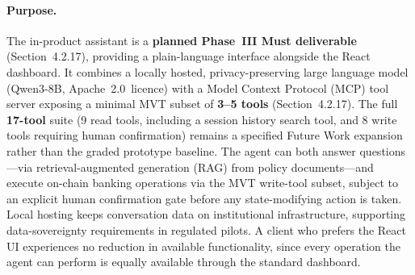 \documentclass[12pt,a4paper]{article}
\begin{document}
\paragraph{Purpose.}
The in-product assistant is a \textbf{planned Phase~III Must deliverable} (Section~4.2.17), providing a plain-language interface alongside the React dashboard. It combines a locally hosted, privacy-preserving large language model (Qwen3-8B, Apache~2.0~licence) with a Model Context Protocol (MCP) tool server exposing a minimal MVT subset of \textbf{3--5 tools} (Section~4.2.17). The full \textbf{17-tool} suite (9 read tools, including a session history search tool, and 8 write tools requiring human confirmation) remains a specified Future Work expansion rather than the graded prototype baseline. The agent can both answer questions---via retrieval-augmented generation (RAG) from policy documents---and execute on-chain banking operations via the MVT write-tool subset, subject to an explicit human confirmation gate before any state-modifying action is taken. Local hosting keeps conversation data on institutional infrastructure, supporting data-sovereignty requirements in regulated pilots. A client who prefers the React UI experiences no reduction in available functionality, since every operation the agent can perform is equally available through the standard dashboard.
\end{document}
